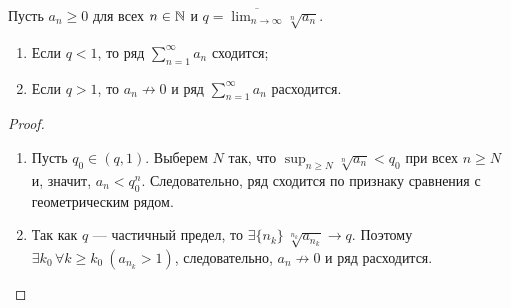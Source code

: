 \begin{theorem}
    \label{cauchy-test}
    Пусть $a_n \ge 0$ для всех $n \in \mathbb{N}$ и $q = \overline{\lim_{n \rightarrow \infty}} \sqrt[n]{a_n}$.

    \begin{enumerate}
        \item Если $q < 1$, то ряд $\sum_{n = 1}^\infty a_n$ сходится;
        \item Если $q > 1$, то $a_n \not\rightarrow 0$ и ряд $\sum_{n = 1}^\infty a_n$ расходится.
    \end{enumerate}

    \begin{proof}
        \begin{enumerate}
            \item Пусть $q_0 \in (q, 1)$. Выберем $N$ так, что $\sup_{n \ge N} \sqrt[n]{a_n} < q_0$ при всех $n \ge N$ и, значит, $a_n < q_0^n$. Следовательно, ряд сходится по признаку сравнения с геометрическим рядом.

            \item Так как $q$ --- частичный предел, то $\exists \{n_k\} \ \sqrt[n_k]{a_{n_k}} \rightarrow q$. Поэтому $\exists k_0 \, \forall k \ge k_0 \ (a_{n_k} > 1)$, следовательно, $a_n \not\rightarrow 0$ и ряд расходится.
        \end{enumerate}
    \end{proof}
\end{theorem}

